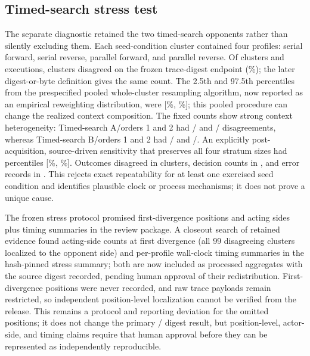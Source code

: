 \documentclass[aps,reprint,superscriptaddress,longbibliography,floatfix]{revtex4-2}
\begin{document}
\subsection{Timed-search stress test}

The separate diagnostic retained the two timed-search opponents rather than
silently excluding them.  Each seed-condition cluster contained four profiles:
serial forward, serial reverse, parallel forward, and parallel reverse.  Of
\StressClusters{} clusters and \StressExecutions{} executions,
\StressTraceMismatch{} clusters disagreed on the frozen trace-digest endpoint
(\StressTracePct\%); the later digest-or-byte definition gives the same count.
The 2.5th and 97.5th percentiles from the prespecified pooled whole-cluster
resampling algorithm, now reported as an empirical reweighting distribution,
were [\StressTraceLowPct\%, \StressTraceHighPct\%]; this pooled procedure can
change the realized context composition.  The fixed counts show strong context
heterogeneity: Timed-search A/orders 1 and 2 had
\StressAFirstMismatch{}/\StressStratumClusters{} and
\StressASecondMismatch{}/\StressStratumClusters{} disagreements, whereas
Timed-search B/orders 1 and 2 had
\StressBFirstMismatch{}/\StressStratumClusters{} and
\StressBSecondMismatch{}/\StressStratumClusters{}.  An explicitly
post-acquisition, source-driven sensitivity that preserves all four stratum
sizes had percentiles [\StressFixedCompositionLowPct\%,
\StressFixedCompositionHighPct\%].  Outcomes disagreed in
\StressOutcomeMismatch{} clusters, decision counts in \StressDecisionMismatch{},
and error records in \StressErrorMismatch{}.  This rejects exact repeatability
for at least one exercised seed condition and identifies plausible clock or
process mechanisms; it does not prove a unique cause.

The frozen stress protocol promised first-divergence positions and acting
sides plus timing summaries in the review package.  A closeout search of
retained evidence found acting-side counts at first divergence (all 99
disagreeing clusters localized to the opponent side) and per-profile
wall-clock timing summaries in the hash-pinned stress summary; both are now
included as processed aggregates with the source digest recorded, pending
human approval of their redistribution.  First-divergence positions were never recorded, and raw
trace payloads remain restricted, so independent position-level localization
cannot be verified from the release.  This remains a protocol and reporting
deviation for the omitted positions; it does not change the primary
\StressTraceMismatch{}/\StressClusters{} digest result, but position-level,
actor-side, and timing claims require that human approval before they can be
represented as independently reproducible.
\end{document}

